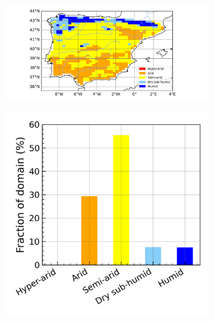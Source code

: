 \begin{figure}[htbp]
    \begin{subfigure}[b]{0.67\textwidth}
        \caption{}
        \includegraphics[width=\textwidth]{images/chap4/future/aridity_index_fut_irr.png}
    \end{subfigure}
    \begin{subfigure}[b]{0.31\textwidth}
        \caption{}
        \includegraphics[width=\textwidth]{images/chap4/future/aridity_index_distribution_fut_irr.png}
    \end{subfigure}
    \caption{}
    \label{fig:aridity_index_v2}
\end{figure}
